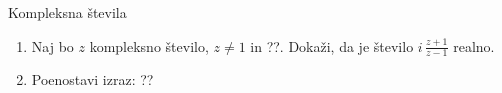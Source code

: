 \begin{frame}{Kompleksna števila}
	\begin{enumerate}
		\item
		Naj bo $z$ kompleksno število, $z \ne 1$ in ??.
		Dokaži, da je število \( i \, \frac{z+1}{z-1} \) realno.
		\item
		Poenostavi izraz:
		??
	\end{enumerate}
\end{frame}
